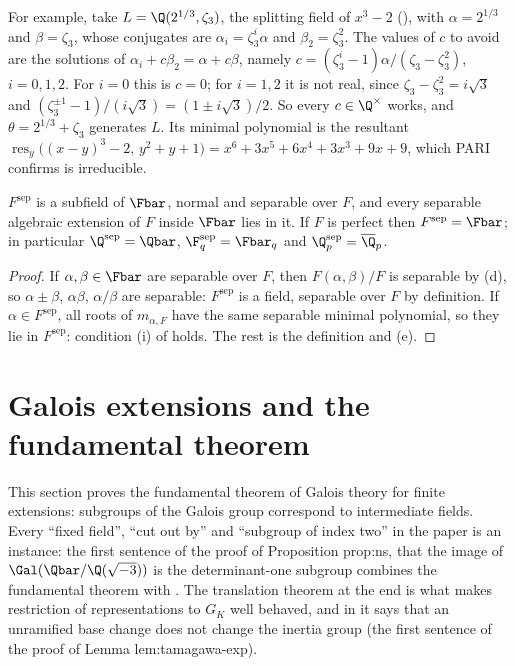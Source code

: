 For example, take $L=\Q(2^{1/3},\zeta_3)$, the splitting field of $x^3-2$ (), with $\alpha=2^{1/3}$ and $\beta=\zeta_3$, whose conjugates are
$\alpha_i=\zeta_3^{i}\alpha$ and $\beta_2=\zeta_3^2$. The values of $c$ to avoid are the solutions of $\alpha_i+c\beta_2=\alpha+c\beta$, namely
$c=(\zeta_3^i-1)\alpha/(\zeta_3-\zeta_3^2)$, $i=0,1,2$. For $i=0$ this is $c=0$; for $i=1,2$ it is not real, since $\zeta_3-\zeta_3^2=i\sqrt3$ and
$(\zeta_3^{\pm1}-1)/(i\sqrt3)=(1\pm i\sqrt3)/2$. So every $c\in\Q^\times$ works, and $\theta=2^{1/3}+\zeta_3$ generates $L$. Its minimal polynomial is the resultant
$\operatorname{res}_y\bigl((x-y)^3-2,\,y^2+y+1\bigr)=x^6+3x^5+6x^4+3x^3+9x+9$, which PARI confirms is irreducible.

\begin{proposition}\label{prop:galois:separable-closure}
$F^{\mathrm{sep}}$ is a subfield of $\Fbar$, normal and separable over $F$, and every separable algebraic extension of $F$ inside $\Fbar$ lies in it. If $F$
is perfect then $F^{\mathrm{sep}}=\Fbar$; in particular $\Q^{\mathrm{sep}}=\Qbar$, $\F_q^{\mathrm{sep}}=\Fbar_q$ and $\Q_p^{\mathrm{sep}}=\overline{\Q}_p$.
\end{proposition}

\begin{proof}
If $\alpha,\beta\in\Fbar$ are separable over $F$, then $F(\alpha,\beta)/F$ is separable by (d), so $\alpha\pm\beta$, $\alpha\beta$,
$\alpha/\beta$ are separable: $F^{\mathrm{sep}}$ is a field, separable over $F$ by definition. If $\alpha\in F^{\mathrm{sep}}$, all roots of $m_{\alpha,F}$ have the
same separable minimal polynomial, so they lie in $F^{\mathrm{sep}}$: condition (i) of  holds. The rest is the definition and
(e).
\end{proof}

\section{Galois extensions and the fundamental theorem}\label{sec:galois:fundamental}

This section proves the fundamental theorem of Galois theory for finite extensions: subgroups of the Galois group correspond to intermediate fields.
Every ``fixed field'', ``cut out by'' and ``subgroup of index two'' in the paper is an instance: the first sentence of the proof of Proposition prop:ns, that the image
of $\Gal(\Qbar/\Q(\sqrt{-3}))$ is the determinant-one subgroup combines the fundamental theorem with . The translation
theorem at the end is what makes restriction of representations to $G_K$ well behaved, and in  it says that an unramified base change
does not change the inertia group (the first sentence of the proof of Lemma lem:tamagawa-exp).

